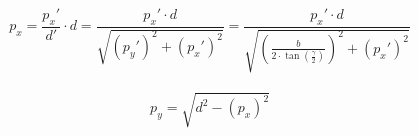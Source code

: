 		
		\begin{equation}
			p_x=\frac{{p_x}'}{d'}\cdot d=\frac{{p_x}'\cdot d}{\sqrt{({p_y}')^2+({p_x}')^2}}=\frac{{p_x}'\cdot d}{\sqrt{\left(\frac{b}{2\cdot \tan(\frac{\gamma}{2})}\right)^2+({p_x}')^2}}
			\label{eq: final}
		\end{equation}\\
	
		\begin{equation}
			p_y=\sqrt{d^2-(p_x)^2}
			\label{eq: ypos}
		\end{equation}\\
		
	
		
	
		
			
	
		


	     
	


